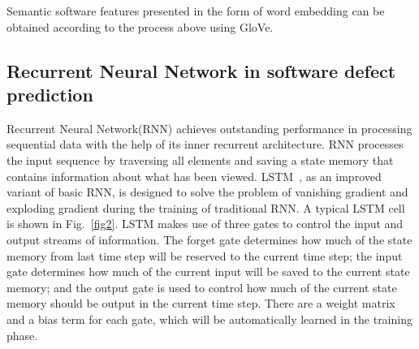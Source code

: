 \documentclass[journal]{IEEEtran}
\begin{document}
Semantic software features presented in the form of word embedding can be obtained according to the process above using GloVe.

\subsection{Recurrent Neural Network in software defect prediction}

Recurrent Neural Network(RNN) achieves outstanding performance in processing sequential data with the help of its inner recurrent architecture. RNN processes the input sequence by traversing all elements and saving a state memory that contains information about what has been viewed. LSTM~\cite{hochreiter1997long}, as an improved variant of basic RNN, is designed to solve the problem of vanishing gradient and exploding gradient during the training of traditional RNN. A typical LSTM cell is shown in Fig.~\ref{fig2}. LSTM makes use of three gates to control the input and output streams of information. The forget gate determines how much of the state memory from last time step will be reserved to the current time step; the input gate determines how much of the current input will be saved to the current state memory; and the output gate is used to control how much of the current state memory should be output in the current time step. There are a weight matrix and a bias term for each gate, which will be automatically learned in the training phase.
\end{document}
